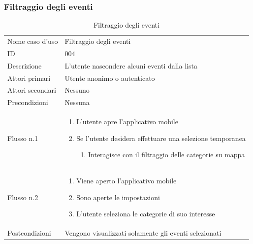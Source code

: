 \documentclass{article}
\begin{document}
\clearpage

\subsubsection{Filtraggio degli eventi}

\begin{table}[htbp]
    \label{8.2.3}
    \centering
    \begin{tabularx}{\textwidth}{| l | X |}
        \Xhline{2pt} %
        Nome caso d'uso & Filtraggio degli eventi \\
        \Xhline{2pt} %
        ID & 004 \\
        \hline
        Descrizione & L'utente nascondere alcuni eventi dalla lista\\
        \hline
        Attori primari & Utente anonimo o autenticato\\
        \hline
        Attori secondari & Nessuno \\
        \hline
        Precondizioni & Nessuna \\
        \hline
        Flusso n.1 & 
        \begin{enumerate}[topsep=5pt,partopsep=0pt,parsep=0pt,itemsep=0pt,before=\vspace{-\baselineskip},after=\vspace{-\baselineskip}]                
            \item L'utente apre l'applicativo mobile
            \item Se l'utente desidera effettuare una selezione temporanea
            \begin{enumerate}[leftmargin=*, nosep]
                \item Interagisce con il filtraggio delle categorie su mappa
            \end{enumerate}
        \end{enumerate}
        \\
        \hline
        Flusso n.2 &
        \begin{enumerate}[topsep=5pt,partopsep=0pt,parsep=0pt,itemsep=0pt,before=\vspace{-\baselineskip},after=\vspace{-\baselineskip}]                
            \item Viene aperto l'applicativo mobile
            \item Sono aperte le impostazioni
            \item L'utente seleziona le categorie di suo interesse
        \end{enumerate}
        \\
        \hline
        Postcondizioni & Vengono visualizzati solamente gli eventi selezionati \\
        \hline
    \end{tabularx}
    \caption{Filtraggio degli eventi}
\end{table}
\end{document}
